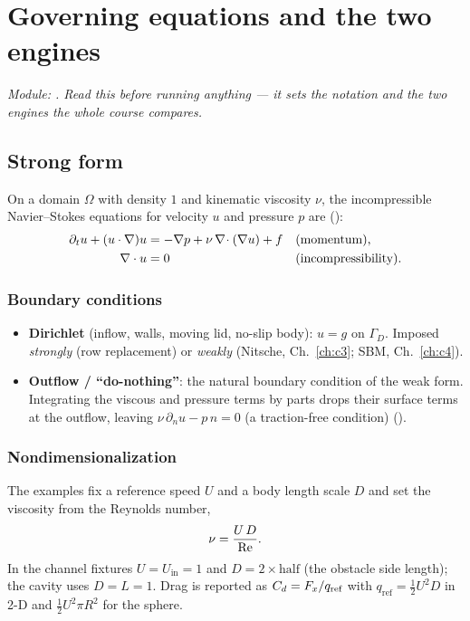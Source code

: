 \chapter{Governing equations and the two engines}
\label{ch:c0}

\emph{Module: . Read this before
running anything --- it sets the notation and the two engines the whole
course compares.}

\section{Strong form}

On a domain $\Omega$ with density $1$ and kinematic viscosity $\nu$, the
incompressible Navier--Stokes equations for velocity $u$ and pressure $p$
are ():
\begin{align}
\partial_t u + (u\cdot\nabla)u &= -\nabla p + \nu\,\nabla\!\cdot(\nabla u) + f
  &&\text{(momentum),}\\
\nabla\cdot u &= 0 &&\text{(incompressibility).}
\end{align}

\subsection{Boundary conditions}
\begin{itemize}
\item \textbf{Dirichlet} (inflow, walls, moving lid, no-slip body): $u=g$
  on $\Gamma_D$. Imposed \emph{strongly} (row replacement) or \emph{weakly}
  (Nitsche, Ch.~\ref{ch:c3}; SBM, Ch.~\ref{ch:c4}).
\item \textbf{Outflow / ``do-nothing''}: the natural boundary condition of
  the weak form. Integrating the viscous and pressure terms by parts drops
  their surface terms at the outflow, leaving $\nu\,\partial_n u - p\,n=0$
  (a traction-free condition) ().
\end{itemize}

\subsection{Nondimensionalization}
The examples fix a reference speed $U$ and a body length scale $D$ and set
the viscosity from the Reynolds number,
\begin{equation}
\nu = \frac{U\,D}{\mathrm{Re}}.
\end{equation}
In the channel fixtures $U=U_{\text{in}}=1$ and $D=2\times\text{half}$ (the
obstacle side length); the cavity uses $D=L=1$. Drag is reported as
$C_d = F_x/q_{\text{ref}}$ with $q_{\text{ref}}=\tfrac12 U^2 D$ in 2-D and
$\tfrac12 U^2\pi R^2$ for the sphere.

